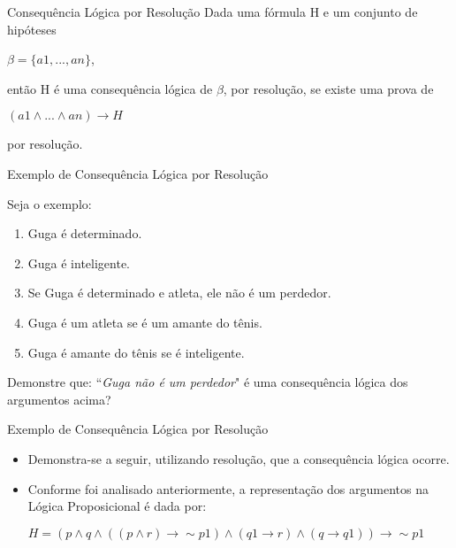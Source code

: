 \begin{frame}{Consequência Lógica por Resolução}
Dada uma fórmula H e um conjunto de hipóteses

$\beta = \{a1,...,an\}$,

então H é uma consequência lógica de $\beta$, por resolução, se existe uma prova de

$(a1 \wedge ... \wedge an) \rightarrow H $

por resolução.
\end{frame}

\begin{frame}{Exemplo de Consequência Lógica por Resolução}

Seja o exemplo:
\begin{enumerate}
\item Guga é determinado.

\item Guga é inteligente.

\item Se Guga é determinado e atleta, ele não é um perdedor.

\item Guga é um atleta se é um amante do tênis.

\item Guga é amante do tênis se é inteligente.
\end{enumerate}

Demonstre que: ``\textit{Guga não é um perdedor}" é uma consequência lógica dos argumentos acima?
\end{frame}

\begin{frame}{Exemplo de Consequência Lógica por Resolução}
\begin{itemize}
\item Demonstra-se a seguir, utilizando resolução, que a consequência lógica ocorre.
\vspace{0.7cm}

\item Conforme foi analisado anteriormente, a representação dos argumentos na Lógica Proposicional é dada por:
\vspace{0.7cm}

$H = (p \wedge q \wedge ((p \wedge r) \rightarrow \sim p1) \wedge (q1 \rightarrow r) \wedge (q \rightarrow q1)) \rightarrow \sim p1$
\end{itemize}
\end{frame}

